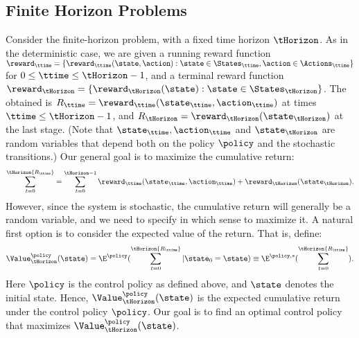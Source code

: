 \subsection{Finite Horizon Problems}
Consider the finite-horizon problem, with a fixed time horizon
$\tHorizon$. As in the deterministic case, we are given a running
reward function ${\reward_\ttime} = \{
{\reward_\ttime}(\state,\action):\state \in {\States_\ttime},\action
\in {\Actions_\ttime}\} $ for $0 \le \ttime \le \tHorizon -1$, and a
terminal reward function ${\reward_\tHorizon} = \{
{\reward_\tHorizon}(\state):\state \in {\States_\tHorizon}\} $.  The
obtained is  $R_\ttime =
{\reward_\ttime}({\state_\ttime},{\action_\ttime})$ at times $\ttime
\le \tHorizon -1$, and ${R_\tHorizon} =
{\reward_\tHorizon}({\state_\tHorizon})$ at the last stage. (Note
that $\state_\ttime,\action_\ttime$ and $\state_\tHorizon$ are
random variables that depend both on the policy $\policy$ and the
stochastic transitions.)
 Our
general goal is to maximize the cumulative return:
\[
\sum\limits_{t = 0}^\tHorizon {{R_\ttime}}  = \sum\limits_{t =
0}^{\tHorizon -1}
{{\reward_\ttime}({\state_\ttime},{\action_\ttime}) +
{\reward_\tHorizon}({\state_\tHorizon})} .
\]
However, since the system is
stochastic, the cumulative return will generally be a random variable, and we
need to specify in which sense to maximize it. A natural first
option is to consider the expected value of the return. That is,
define:
\[\Value_\tHorizon^\policy (\state) = {\E^\policy }(\sum\limits_{t = 0}^\tHorizon {{R_\ttime}} |{\state_0} = \state) \equiv {\E^{\policy ,s}}(\sum\limits_{t = 0}^\tHorizon {{R_\ttime}} ) .\]
Here $\policy $ is the control policy as defined above, and $\state$
denotes the initial state. Hence,  $\Value_\tHorizon^\policy
(\state)$ is the expected cumulative return under the control policy
$\policy $.  Our goal is to find an optimal control policy that
maximizes $\Value_\tHorizon^\policy
 (\state)$.

